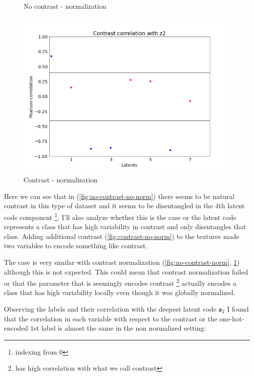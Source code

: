 \documentclass[12pt, english]{article}
\begin{document}
\begin{figure}[H]
\begin{minipage}{0.5\linewidth}
    \caption{No contrast - normalization} 
    \label{fig:no-contrast-norm}
  \end{minipage}%
  \begin{minipage}{0.5\linewidth}
    \centering
    \includegraphics[width=.72\linewidth]{contrast_to_latent/norm_contrast_correlation.png} 
    \caption{Contrast - normalization} 
    \label{fig:contrast-norm}
  \end{minipage} 
\end{figure}

\vspace{4mm}

\par Here we can see that in (\ref{fig:no-contrast-no-norm}) there seems to be natural contrast in this type of dataset and it seems to be disentangled in the $4$th latent code component \footnote{indexing from $0$}. I'll also analyze whether this is the case or the latent code represents a class that has high variability in contrast and only disentangles that class. Adding additional contrast (\ref{fig:contrast-no-norm}) to the textures made two variables to encode something like contrast.

\vspace{4mm}

\par The case is very similar with contrast normalization (\ref{fig:no-contrast-norm}, \ref{fig:contrast-norm}) although this is not expected. This could mean that contrast normalization failed or that the parameter that is seemingly encodes contrast \footnote{has high correlation with what we call contrast} actually encodes a class that has high variability locally even though it was globally normalized.

\vspace{4mm}

\par Observing the labels and their correlation with the deepest latent code $\bm{z}_{2}$ I found that the correlation in each variable with respect to the contrast or the one-hot-encoded $1$st label is almost the same in the non normalized setting:
\end{document}
